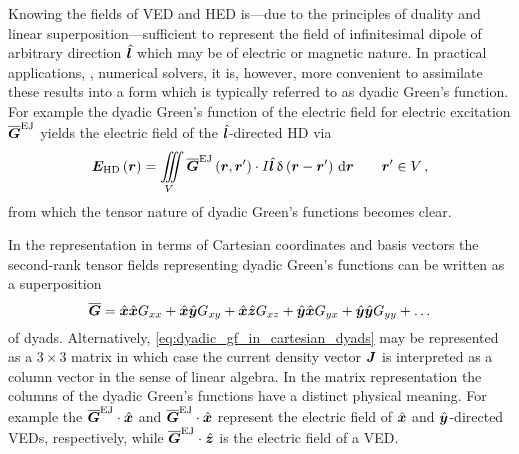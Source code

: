 Knowing the fields of \ac{VED} and \ac{HED} is---due to the principles of
duality and linear superposition---sufficient to represent the field of
infinitesimal dipole of arbitrary direction $\uv{l}$ which may be of electric
or magnetic nature.
In practical applications, \eg, numerical solvers, it is, however, more
convenient to assimilate these results into a form which is typically referred
to as dyadic Green's function.
For example the dyadic Green's function of the electric field for electric
excitation $\dyadicGF{EJ}$ yields the electric field of the $\uv{l}$-directed
\ac{HD} via
\begin{equation}
	\pvec{E}_\mathrm{HD} \left(\robs\right) = 
	\iiint\limits_{V}
	\dyadicGF{EJ} \left(\robs, \rsrc\right)
	\cdot
	I \uv{l} \diracDelta \left(\rdiff\right)
	\, 
	\dd \robs 
	\qquad \rsrc \in V
	\, ,
\end{equation}
from which the tensor nature of dyadic Green's functions becomes clear.

In the representation in terms of Cartesian coordinates and basis vectors the
second-rank tensor fields representing dyadic Green's functions can be written
as a superposition
\begin{equation}\label{eq:dyadic_gf_in_cartesian_dyads}
	\dyad{G} = 
	\uv{x}\uv{x} G_{xx} +
	\uv{x}\uv{y} G_{xy} +
	\uv{x}\uv{z} G_{xz} +
	\uv{y}\uv{x} G_{yx} +
	\uv{y}\uv{y} G_{yy} +
	\ldots
\end{equation}
of dyads.
Alternatively, \eqref{eq:dyadic_gf_in_cartesian_dyads} may be represented
as a $3 \times 3$ matrix in which case the current density vector $\pvec{J}$ is
interpreted as a column vector in the sense of linear algebra.
In the matrix representation the columns of the dyadic Green's functions have
a distinct physical meaning.
For example the $\dyadicGF{EJ} \cdot \uv{x}$ and $\dyadicGF{EJ} \cdot \uv{x}$
represent the electric field of $\uv{x}$ and $\uv{y}$-directed \acp{VED},
respectively, while $\dyadicGF{EJ} \cdot \uv{z}$ is the electric field of
a \ac{VED}.

